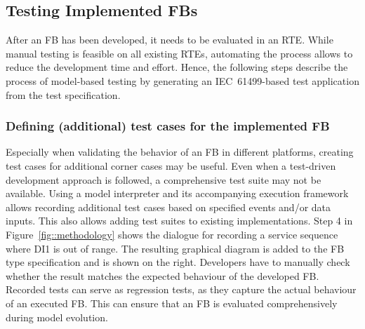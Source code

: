\subsection{Testing Implemented FBs}
    After an FB has been developed, it needs to be evaluated in an RTE. While manual testing is feasible on all existing RTEs, automating the process allows to reduce the development time and effort. Hence, the following steps describe the process of model-based testing by generating an IEC~61499-based test application from the test specification.

\setcounter{subsubsection}{3}
   \subsubsection{Defining (additional) test cases for the implemented FB}
    Especially when validating the behavior of an FB in different platforms, creating test cases for additional corner cases may be useful. Even when a test-driven development approach is followed, a comprehensive test suite may not be available. Using a model interpreter and its accompanying execution framework~\cite{wiesmayr2021} allows recording additional test cases based on specified events and/or data inputs. This also allows adding test suites to existing implementations.  Step 4 in Figure~\ref{fig::methodology} shows the dialogue for recording a service sequence where DI1 is out of range. The resulting graphical diagram is added to the FB type specification and is shown on the right. Developers have to manually check whether the result matches the expected behaviour of the developed FB. Recorded tests can serve as regression tests, as they capture the actual behaviour of an executed FB. This can ensure that an FB is evaluated comprehensively during model evolution. 
  
